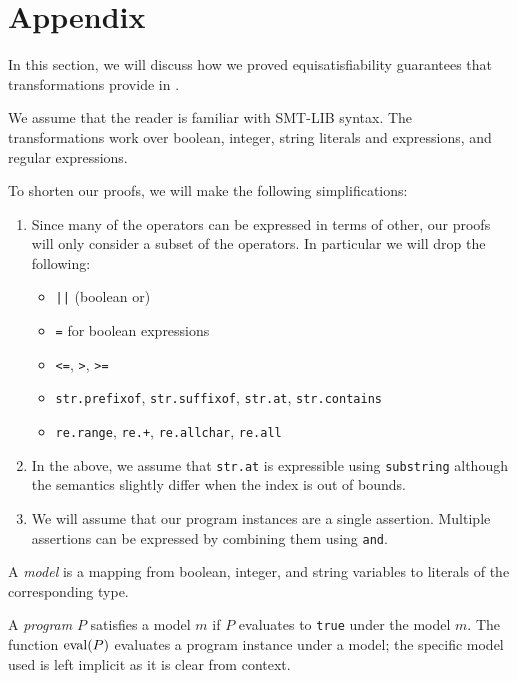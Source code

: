\section{Appendix}

In this section, we will discuss how we proved equisatisfiability guarantees
that transformations provide in \fuzzer{}.

We assume that the reader is familiar with SMT-LIB syntax. The transformations
work over boolean, integer, string literals and expressions, and regular
expressions.

To shorten our proofs, we will make the following simplifications:
\begin{enumerate}
  \item
    Since many of the operators can be expressed in terms of other, our
    proofs will only consider a subset of the operators. In particular we will
    drop the following:
    \begin{itemize}
      \item \texttt{||} (boolean or)
      \item \texttt{=} for boolean expressions
      \item \texttt{<=}, \texttt{>}, \texttt{>=}
      \item \texttt{str.prefixof}, \texttt{str.suffixof}, \texttt{str.at}, \texttt{str.contains}
      \item \texttt{re.range}, \texttt{re.+}, \texttt{re.allchar}, \texttt{re.all}
    \end{itemize}

  \item
    In the above, we assume that \texttt{str.at} is expressible using
    \texttt{substring} although the semantics slightly differ when the index is
    out of bounds.

  \item
    We will assume that our program instances are a single assertion. Multiple
    assertions can be expressed by combining them using \texttt{and}.
\end{enumerate}

\begin{definition}
  A \emph{model} is a mapping from boolean, integer, and string variables to
literals of the corresponding type.
\end{definition}

\begin{definition}
  A \emph{program} $P$ satisfies a model $m$ if $P$ evaluates to \texttt{true}
under the model $m$. The function $\operatorname{eval} (P)$ evaluates a program instance
under a model; the specific model used is left implicit as it is clear from
context.
\end{definition}

